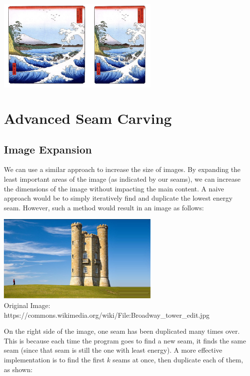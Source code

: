 \documentclass{article}
\begin{document}
\begin{center}
\includegraphics[width=8cm]{content_aware_resizing.png} \\
\end{center}

\section{Advanced Seam Carving}
\subsection{Image Expansion}
We can use a similar approach to increase the size of images. By expanding the least important areas of the image (as indicated by our seams), we can increase the dimensions of the image without impacting the main content. A naive approach would be to simply iteratively find and duplicate the lowest energy seam. However, such a method would result in an image as follows:

\begin{center}
\includegraphics[width=8cm]{Naive_Castle_Resizing.jpg} \\
Original Image: https://commons.wikimedia.org/wiki/File:Broadway\_tower\_edit.jpg
\end{center}
On the right side of the image, one seam has been duplicated many times over. This is because each time the program goes to find a new seam, it finds the same seam (since that seam is still the one with least energy). A more effective implementation is to find the first $k$ seams at once, then duplicate each of them, as shown:
\end{document}
